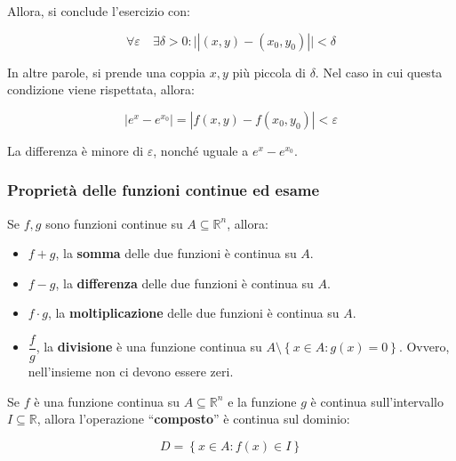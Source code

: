\documentclass[a4paper]{article}
\newcommand{\dquotes}[1]{``#1''}
\begin{document}
	\noindent
	Allora, si conclude l'esercizio con:
	
	\begin{equation*}
		\forall\varepsilon \hspace{1em} \exists\delta > 0 : \Big|\left|\left(x,y\right) - \left(x_{0}, y_{0}\right)\right|\Big| < \delta
	\end{equation*}

	\noindent
	In altre parole, si prende una coppia $x,y$ più piccola di $\delta$. Nel caso in cui questa condizione viene rispettata, allora:
	
	\begin{equation*}
		\left|e^{x} - e^{x_{0}}\right| = \left|f\left(x,y\right) - f\left(x_{0}, y_{0}\right)\right| < \varepsilon
	\end{equation*}

	\noindent
	La differenza è minore di $\varepsilon$, nonché uguale a $e^{x} - e^{x_{0}}$.
	
	\newpage
	
	\subsubsection{Proprietà delle funzioni continue ed \textcolor{Red3}{esame}}
	
	Se $f,g$ sono funzioni continue su $A \subseteq \mathbb{R}^{n}$, allora:
	
	\begin{itemize}[label=-]
		\item $f + g$, la \textbf{somma} delle due funzioni è continua su $A$.
		\item $f - g$, la \textbf{differenza} delle due funzioni è continua su $A$.
		\item $f \cdot g$, la \textbf{moltiplicazione} delle due funzioni è continua su $A$.
		\item $\dfrac{f}{g}$, la \textbf{divisione} è una funzione continua su $A \setminus \left\{x \in A : g\left(x\right) = 0\right\}$. Ovvero, nell'insieme non ci devono essere zeri.
	\end{itemize}
	
	\noindent
	Se $f$ è una funzione continua su $A \subseteq \mathbb{R}^{n}$ e la funzione $g$ è continua sull'intervallo $I \subseteq \mathbb{R}$, allora l'operazione \dquotes{\textbf{composto}} è continua sul dominio:
	
	\begin{equation*}
		D = \left\{x \in A: f\left(x\right) \in I\right\}
	\end{equation*}
	
\end{document}
